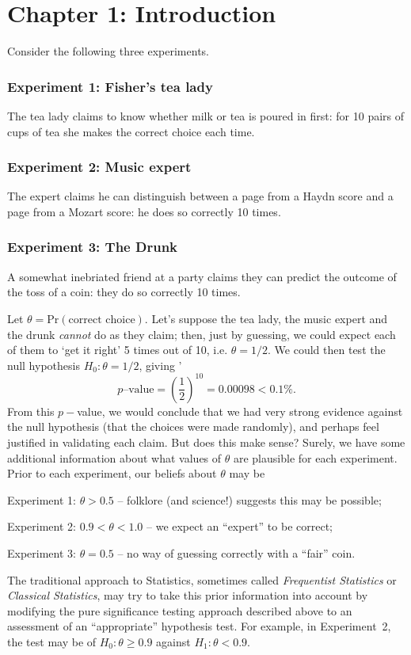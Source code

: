 \chapter{Chapter 1: Introduction}

Consider the following three experiments.
\subsection*{Experiment 1: Fisher's tea lady}
The tea lady claims to know whether milk or tea is poured in first:
for 10 pairs of cups of tea she makes the correct choice each time.
\subsection*{Experiment 2: Music expert}
The expert claims he can distinguish between a page from a Haydn score
and a page from a Mozart score: he does so correctly 10 times.
\subsection*{Experiment 3: The Drunk}
A somewhat inebriated friend at a party claims they can predict the
outcome of the toss of a coin: they do so correctly 10 times.

Let $\theta=\text{Pr}(\text{correct choice})$. Let's suppose the tea lady, the music expert and the drunk \textit{cannot} do as they claim; then, just by guessing, we could expect each of them to `get it right' 5 times out of 10, i.e. $\theta=1/2$. We could then test the null hypothesis $H_0:\theta=1/2$, giving
'$$p\text{--value}=\left(\frac{1}{2}\right)^{10}=0.00098 < 0.1\%.$$
From this $p-$value, we would conclude that we had very strong
evidence against the null hypothesis (that the choices were made
randomly), and perhaps feel justified in validating each claim.  But
does this make sense? Surely, we have some additional information
about what values of $\theta$ are plausible for each experiment. Prior
to each experiment, our beliefs about $\theta$ may be

Experiment 1: $\theta>0.5$ -- folklore (and science!) suggests this may be possible;

Experiment 2: $0.9<\theta<1.0$ -- we expect an ``expert'' to be
correct;

Experiment 3: $\theta=0.5$ -- no way of guessing correctly with a
``fair'' coin.

The traditional approach to Statistics, sometimes called {\it
Frequentist Statistics} or {\it Classical Statistics}, may try to take
this prior information into account by modifying the pure significance
testing approach described above to an assessment of an
``appropriate'' hypothesis test. For example, in Experiment~2, the
test may be of $H_0:\theta\geq 0.9$ against $H_1:\theta<0.9$.

